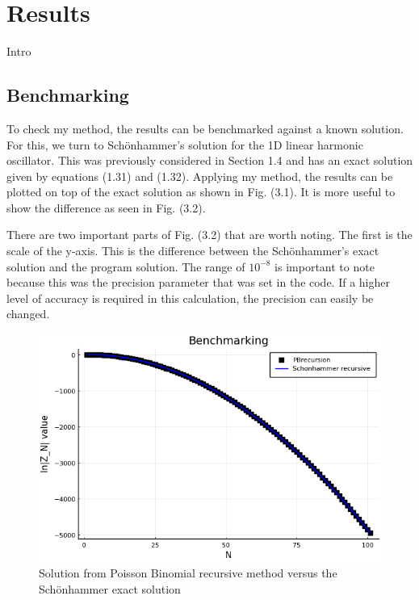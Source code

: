 \chapter{Results}\label{ch:cfd}
\begin{em}
Intro
\end{em}
\section{Benchmarking}
To check my method, the results can be benchmarked against a known solution. For this, we turn to Sch\"onhammer's solution for the 1D linear harmonic oscillator. This was previously considered in Section 1.4 and has an exact solution given by equations (1.31) and (1.32). Applying my method, the results can be plotted on top of the exact solution as shown in Fig. (3.1). It is more useful to show the difference as seen in Fig. (3.2). 

There are two important parts of Fig. (3.2) that are worth noting. The first is the scale of the y-axis. This is the difference between the Sch\"onhammer's exact solution and the program solution. The range of $10^{-8}$ is important to note because this was the precision parameter that was set in the code. If a higher level of accuracy is required in this calculation, the precision can easily be changed.  

\begin{figure}[H]
    \includegraphics[scale=0.75]{figures/pdf/Benchmarking.png}
    \caption{Solution from Poisson Binomial recursive method versus the Sch\"onhammer exact solution}
\end{figure}


